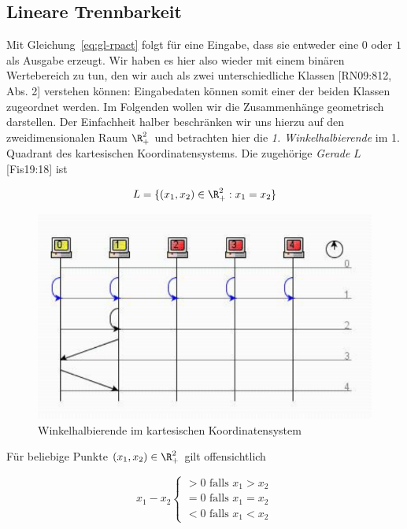 \subsection{Lineare Trennbarkeit}
Mit Gleichung~\ref{eq:gl-rpact} folgt für eine Eingabe, dass sie entweder eine $0$ oder $1$ als Ausgabe erzeugt.
Wir haben es hier also wieder mit einem binären Wertebereich zu tun, den wir auch als zwei unterschiedliche Klassen [RN09:812, Abs. 2] verstehen können: Eingabedaten können somit einer der beiden Klassen zugeordnet werden.
Im Folgenden wollen wir die Zusammenhänge geometrisch darstellen.
Der Einfachheit halber beschränken wir uns hierzu auf den zweidimensionalen Raum $\R_+^2$ und betrachten hier die \textit{1. Winkelhalbierende} im 1. Quadrant des kartesischen Koordinatensystems.
Die zugehörige \textit{Gerade} $L$ [Fis19:18] ist

\begin{equation}
L = \{(x_1, x_2) \in \R_+^2: x_1 = x_2\}
\end{equation}


\begin{figure}[h]
    \centering
    \includegraphics{images/p1ReadSeq.pdf}
    \caption{Winkelhalbierende im kartesischen Koordinatensystem}
    \label{fig-winkelhalbierende}
\end{figure}

Für beliebige Punkte $(x_1, x_2) \in \R_+^2$ gilt offensichtlich

\begin{equation}
x_1 - x_2 \begin{cases}
               > 0 \text{ falls } x_1 > x_2 \\
               = 0 \text{ falls } x_1 = x_2 \\
               < 0 \text{ falls } x_1 < x_2
\end{cases}
\end{equation}

